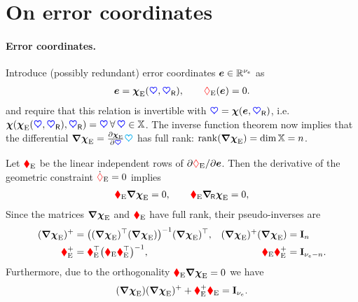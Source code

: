 \section{On error coordinates}
\paragraph{Error coordinates.}
Introduce (possibly redundant) error coordinates $\sysCoordE \in \RealNum^{\numCoordE}$ as
\begin{align}
 \sysCoordE = \sysCoordFktE(\sysCoord, \sysCoordR), \qquad \geoConstraintE(\sysCoordE) = 0.
\end{align}
and require that this relation is invertible with $\sysCoord = \sysCoordFkt(\sysCoordE, \sysCoordR)$, i.e.\ $\sysCoordFkt(\sysCoordFktE(\sysCoord, \sysCoordR), \sysCoordR) = \sysCoord \, \forall \, \sysCoord \in \configSpace$.
The inverse function theorem now implies that the differential $\differential \sysCoordFktE = \pdiff[\sysCoordFktE]{\sysCoord} \kinMat $ has full rank: $\rank(\differential \sysCoordFktE) = \dim \configSpace = \dimConfigSpace$.

Let $\geoConstraintMatE$ be the linear independent rows of $\spdiff[\geoConstraintE]{\sysCoordE}$.
Then the derivative of the geometric constraint $\geoConstraintEd = 0$ implies
\begin{align}
 \geoConstraintMatE \differential \sysCoordFktE = 0,
\qquad
 \geoConstraintMatE \differentialR \sysCoordFktE = 0,
\end{align}
Since the matrices $\differential \sysCoordFktE$ and $\geoConstraintMatE$ have full rank, their pseudo-inverses are
\begin{align}
 (\differential \sysCoordFktE)^+ &= \big( (\differential \sysCoordFktE)^\top (\differential \sysCoordFktE) \big)^{-1} (\differential \sysCoordFktE)^\top,&
 (\differential \sysCoordFktE)^+ (\differential \sysCoordFktE) &= \idMat[\dimConfigSpace]
\\
 \geoConstraintMatE^+ &= \geoConstraintMatE^\top \big( \geoConstraintMatE \geoConstraintMatE^\top \big)^{-1},&
 \geoConstraintMatE \geoConstraintMatE^+ &= \idMat[\numCoordE - \dimConfigSpace].
\end{align}
Furthermore, due to the orthogonality $\geoConstraintMatE \differential \sysCoordFktE = 0$ we have
\begin{align}
 (\differential \sysCoordFktE) (\differential \sysCoordFktE)^+ + \geoConstraintMatE^+ \geoConstraintMatE = \idMat[\numCoordE].
\end{align}

